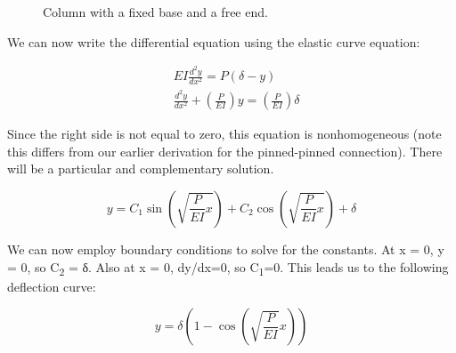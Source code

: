 \documentclass[
  letterpaper,
  DIV=11,
  numbers=noendperiod]{scrreprt}
\theoremstyle{definition}
\theoremstyle{remark}
\begin{document}
\begin{figure}


\caption{\label{fig-15.8}Column with a fixed base and a free end.}

\end{figure}%

We can now write the differential equation using the elastic curve
equation:

\[
\begin{aligned}
& E I \frac{d^2 y}{d x^2}=P(\delta-y) \\
& \frac{d^2 y}{d x^2}+\left(\frac{P}{E I}\right) y=\left(\frac{P}{E I}\right) \delta
\end{aligned}
\]

Since the right side is not equal to zero, this equation is
nonhomogeneous (note this differs from our earlier derivation for the
pinned-pinned connection). There will be a particular and complementary
solution.

\[
y=C_1 \sin \left(\sqrt{\frac{P}{E I} x}\right)+C_2 \cos \left(\sqrt{\frac{P}{E I} x}\right)+\delta
\]

We can now employ boundary conditions to solve for the constants. At x =
0, y = 0, so C\textsubscript{2} = δ. Also at x = 0, dy/dx=0, so
C\textsubscript{1}=0. This leads us to the following deflection curve:

\[
y=\delta\left(1-\cos \left(\sqrt{\frac{P}{E I}} x\right)\right)
\]
\end{document}

